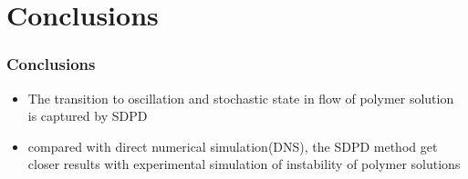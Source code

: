 \section{Conclusions}
\begin{frame}
  \frametitle{Conclusions}
  \begin{itemize}
  \item The transition to oscillation and stochastic state in flow of polymer solution is captured by SDPD
  \item compared with direct numerical simulation(DNS),
the SDPD method get closer results with experimental simulation of instability of polymer solutions
  \end{itemize}
\end{frame}
